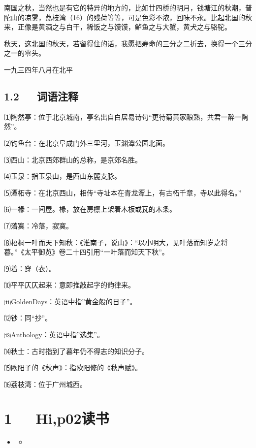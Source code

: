 \documentclass[letterpaper,12pt,english]{sphinxmanual}
\begin{document}
南国之秋，当然也是有它的特异的地方的，比如廿四桥的明月，钱塘江的秋潮，普陀山的凉雾，荔枝湾（16）的残荷等等，可是色彩不浓，回味不永。比起北国的秋来，正像是黄酒之与白干，稀饭之与馍馍，鲈鱼之与大蟹，黄犬之与骆驼。

秋天，这北国的秋天，若留得住的话，我愿把寿命的三分之二折去，换得一个三分之一的零头。

一九三四年八月在北平


\section{1.2   词语注释}
\label{\detokenize{p01_u6563_u6587/_u90c1_u8fbe_u592b-_u53e4_u90fd_u7684_u79cb:id4}}
⑴陶然亭：位于北京城南，亭名出自白居易诗句“更待菊黄家酿熟，共君一醉一陶然”。

⑵钓鱼台：在北京阜成门外三里河，玉渊潭公园北面。

⑶西山：北京西郊群山的总称，是京郊名胜。

⑷玉泉：指玉泉山，是西山东麓支脉。

⑸潭柘寺：在北京西山，相传“寺址本在青龙潭上，有古柘千章，寺以此得名。”

⑹一椽：一间屋。椽，放在房檩上架着木板或瓦的木条。

⑺落寞：冷落，寂寞。

⑻梧桐一叶而天下知秋：《淮南子，说山》：“以小明大，见叶落而知岁之将暮。”《太平御览》卷二十四引用“一叶落而知天下秋”。

⑼着：穿（衣）。

⑽平平仄仄起来：意即推敲起字的韵律来。

⑾GoldenDays：英语中指”黄金般的日子”。

⑿钞：同“抄”。

⒀Anthology：英语中指”选集”。

⒁秋士：古时指到了暮年仍不得志的知识分子。

⒂欧阳子的《秋声》：指欧阳修的《秋声赋》。

⒃荔枝湾：位于广州城西。


\chapter{1   Hi,p02读书}
\label{\detokenize{p02_u8bfb_u4e66/Hello_uff0cp02_u8bfb_u4e66:hi-p02}}\label{\detokenize{p02_u8bfb_u4e66/Hello_uff0cp02_u8bfb_u4e66::doc}}
\begin{sphinxShadowBox}
\begin{itemize}
\item {} 
\label{\detokenize{p02_u8bfb_u4e66/Hello_uff0cp02_u8bfb_u4e66:id2}}{\hyperref[\detokenize{p02_u8bfb_u4e66/Hello_uff0cp02_u8bfb_u4e66:hi-p02}]{}}
\begin{itemize}
\item {} 
\label{\detokenize{p02_u8bfb_u4e66/Hello_uff0cp02_u8bfb_u4e66:id3}}{\hyperref[\detokenize{p02_u8bfb_u4e66/Hello_uff0cp02_u8bfb_u4e66:post}]{}}

\end{itemize}

\end{itemize}
\end{sphinxShadowBox}
\end{document}
